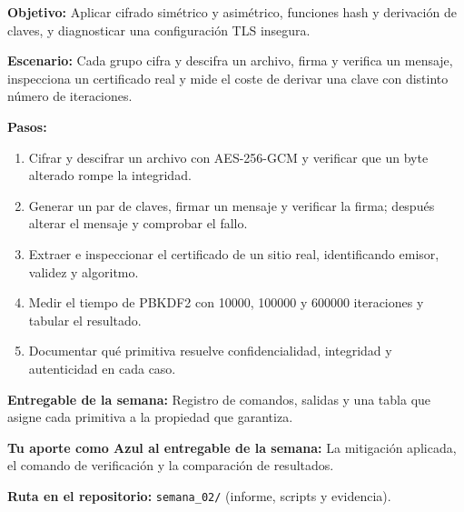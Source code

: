 \documentclass[11pt,a4paper]{article}
\begin{document}
\begin{tcolorbox}[cajaContenido,title={Semana 2 --- Caja de herramientas criptográficas}]
\textbf{Objetivo:} Aplicar cifrado simétrico y asimétrico, funciones hash y derivación de claves, y diagnosticar una configuración TLS insegura.

\textbf{Escenario:} Cada grupo cifra y descifra un archivo, firma y verifica un mensaje, inspecciona un certificado real y mide el coste de derivar una clave con distinto número de iteraciones.


\textbf{Pasos:}
\begin{enumerate}[leftmargin=1.4em,itemsep=2pt,topsep=3pt]
  \item Cifrar y descifrar un archivo con AES-256-GCM y verificar que un byte alterado rompe la integridad.
  \item Generar un par de claves, firmar un mensaje y verificar la firma; después alterar el mensaje y comprobar el fallo.
  \item Extraer e inspeccionar el certificado de un sitio real, identificando emisor, validez y algoritmo.
  \item Medir el tiempo de PBKDF2 con 10000, 100000 y 600000 iteraciones y tabular el resultado.
  \item Documentar qué primitiva resuelve confidencialidad, integridad y autenticidad en cada caso.
\end{enumerate}
\textbf{Entregable de la semana:} Registro de comandos, salidas y una tabla que asigne cada primitiva a la propiedad que garantiza.

\textbf{Tu aporte como Azul al entregable de la semana:} La mitigación aplicada, el comando de verificación y la comparación de resultados.

\textbf{Ruta en el repositorio:} \texttt{semana\_02/} (informe, scripts y evidencia).
\end{tcolorbox}
\end{document}

